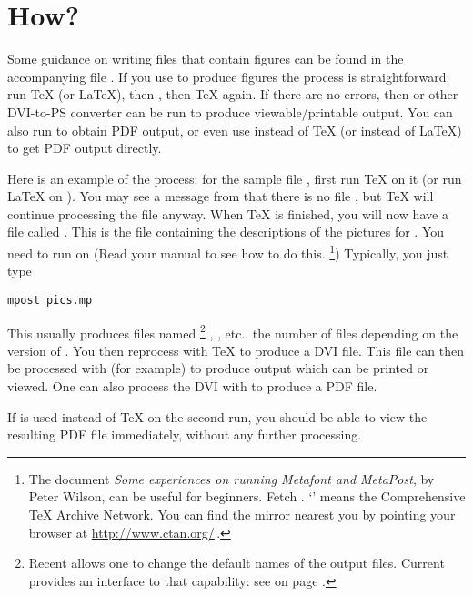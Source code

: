 \documentclass[letterpaper]{article}
\begin{document}
\section{How?}\label{process}

Some guidance on writing files that contain \mfp{} figures can be found
in the accompanying file . If you use \mfp{} to
produce \MP{} figures the process is straightforward: run \TeX{} (or
\LaTeX), then \MP{}, then \TeX{} again. If there are no errors, then
 or other DVI-to-PS converter can be run to produce
viewable\slash printable output. You can also run  to obtain PDF
output, or even use \pdfTeX{} instead of \TeX{} (or \pdfLaTeX{} instead
of \LaTeX{}) to get PDF output directly.

Here is an example of the process: for the sample file
, first run \TeX{} on it (or run \LaTeX{} on
). You may see a message from \mfp{} that there is
no file , but \TeX{} will continue processing the file
anyway. When \TeX{} is finished, you will now have a file called
. This is the \MP{} file containing the descriptions of
the pictures for . You need to run \MP{} on
 (Read your \MP{} manual to see how to do
this.%
    \footnote{The document \textit{Some experiences on running Metafont
    and MetaPost}, by Peter Wilson, can be useful for beginners. Fetch
    . `' means the Comprehensive
    \TeX{} Archive Network. You can find the mirror nearest you by
    pointing your browser at \url{http://www.ctan.org/}\,.}) %
Typically, you just type
\begin{verbatim}
mpost pics.mp
\end{verbatim}

This usually produces files named%
    \footnote{Recent \MP{} allows one to change the default names of the
    output files. Current \mfp{} provides an interface to that
    capability: see  on page
    \pageref{setfilenametemplate}.}
, , etc., the number of files depending on the
version of . You then reprocess 
with \TeX{} to produce a DVI file. This file can then be processed with
 (for example) to produce \PS{} output which can be printed
or viewed. One can also process the DVI with  to
produce a PDF file.

If \pdfTeX{} is used instead of \TeX{} on the second run, you should be
able to view the resulting PDF file immediately, without any further
processing.
\end{document}
